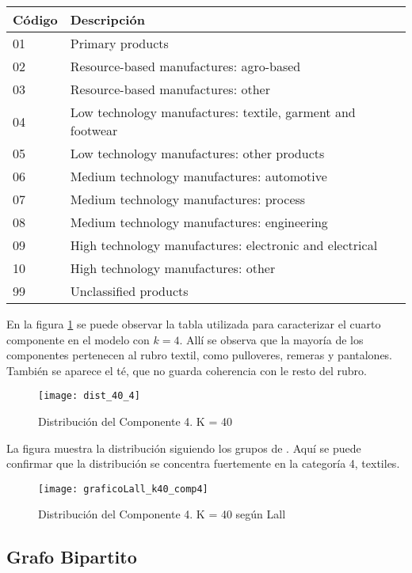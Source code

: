 \documentclass[class=article, crop=false]{standalone}
\begin{document}
\begin{table}[ht]
	\centering
	\begin{tabular}{ll}
		\hline
		 Código & Descripción \\ 
		\hline
		01 & Primary products \\ 
		02 & Resource-based manufactures: agro-based \\ 
		03 & Resource-based manufactures: other \\ 
		04 & Low technology manufactures: textile, garment and footwear \\ 
		05 & Low technology manufactures: other products \\ 
		06 & Medium technology manufactures: automotive \\ 
		07 & Medium technology manufactures: process \\ 
		08 & Medium technology manufactures: engineering \\ 
		09 & High technology manufactures: electronic and electrical \\ 
		10 & High technology manufactures: other \\ 
		99 & Unclassified products \\ 
		\hline
	\end{tabular}
\end{table}

En la figura \ref{fig:dist_40_4} se puede observar la tabla utilizada para caracterizar el cuarto componente en el modelo con $k=4$. Allí se observa que la mayoría de los componentes pertenecen al rubro textil, como pulloveres, remeras y pantalones. También se aparece el té, que no guarda coherencia con le resto del rubro.


\begin{figure}[h]
	\centering	
	\texttt{[image: dist\_40\_4]}
	\caption{Distribución del Componente 4. K = 40}
	\label{fig:dist_40_4}
\end{figure}

La figura muestra la distribución siguiendo los grupos de \cite{lall2000technological}. Aquí se puede confirmar que la distribución se concentra fuertemente en la categoría 4, textiles. 

\begin{figure}[h]
	\centering	
	\texttt{[image: graficoLall\_k40\_comp4]}
	\caption{Distribución del Componente 4. K = 40 según Lall}
	\label{fig:dist_40_4_lall}
\end{figure}



\subsection{Grafo Bipartito}



%
%
%
\end{document}
